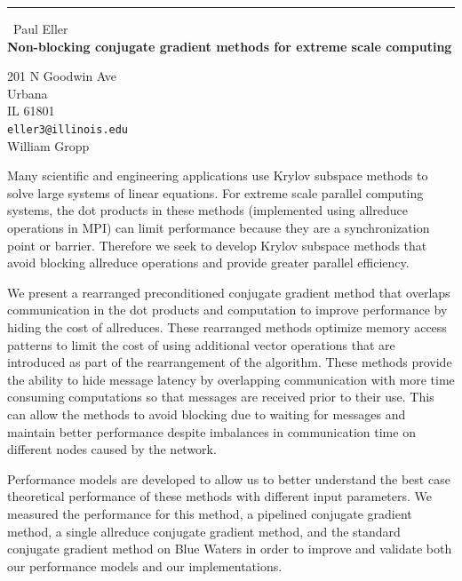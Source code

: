 \documentclass{report}
\begin{document}
\begin{center}
\rule{6in}{1pt} \
{\large Paul Eller \\
{\bf Non-blocking conjugate gradient methods for extreme scale computing}}

201 N Goodwin Ave \\ Urbana \\ IL 61801
\\
{\tt eller3@illinois.edu}\\
William Gropp\end{center}

Many scientific and engineering applications use Krylov subspace methods
to solve large systems of linear equations. For extreme scale parallel
computing systems, the dot products in these methods (implemented using
allreduce operations in MPI) can limit performance because they are a
synchronization point or barrier. Therefore we seek to develop Krylov
subspace methods that avoid blocking allreduce operations and provide
greater parallel efficiency.

We present a rearranged preconditioned conjugate gradient method that
overlaps communication in the dot products and computation to improve
performance by hiding the cost of allreduces. These rearranged methods
optimize memory access patterns to limit the cost of using additional
vector operations that are introduced as part of the rearrangement of the
algorithm. These methods provide the ability to hide message latency by
overlapping communication with more time consuming computations so that
messages are received prior to their use. This can allow the methods to
avoid blocking due to waiting for messages and maintain better
performance despite imbalances in communication time on different nodes
caused by the network.

Performance models are developed to allow us to better understand the
best case theoretical performance of these methods with different input
parameters. We measured the performance for this method, a pipelined
conjugate gradient method, a single allreduce conjugate gradient method,
and the standard conjugate gradient method on Blue Waters in order to
improve and validate both our performance models and our implementations.
\end{document}
